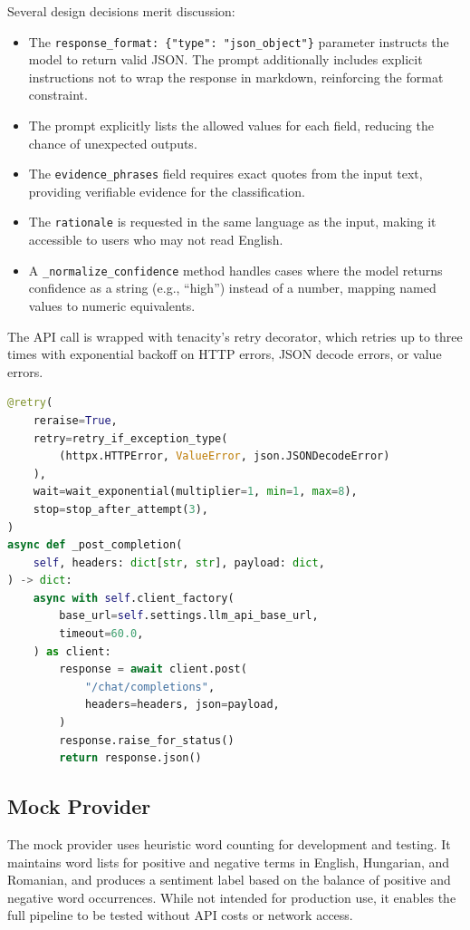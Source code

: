 Several design decisions merit discussion:

\begin{itemize}
    \item The \texttt{response\_format: \{"type": "json\_object"\}} parameter instructs the model to return valid JSON. The prompt additionally includes explicit instructions not to wrap the response in markdown, reinforcing the format constraint.
    \item The prompt explicitly lists the allowed values for each field, reducing the chance of unexpected outputs.
    \item The \texttt{evidence\_phrases} field requires exact quotes from the input text, providing verifiable evidence for the classification.
    \item The \texttt{rationale} is requested in the same language as the input, making it accessible to users who may not read English.
    \item A \texttt{\_normalize\_confidence} method handles cases where the model returns confidence as a string (e.g., ``high'') instead of a number, mapping named values to numeric equivalents.
\end{itemize}

The API call is wrapped with tenacity's retry decorator, which retries up to three times with exponential backoff on HTTP errors, JSON decode errors, or value errors.

\begin{lstlisting}[language=Python, caption={Retry-decorated API call}]
@retry(
    reraise=True,
    retry=retry_if_exception_type(
        (httpx.HTTPError, ValueError, json.JSONDecodeError)
    ),
    wait=wait_exponential(multiplier=1, min=1, max=8),
    stop=stop_after_attempt(3),
)
async def _post_completion(
    self, headers: dict[str, str], payload: dict,
) -> dict:
    async with self.client_factory(
        base_url=self.settings.llm_api_base_url,
        timeout=60.0,
    ) as client:
        response = await client.post(
            "/chat/completions",
            headers=headers, json=payload,
        )
        response.raise_for_status()
        return response.json()
\end{lstlisting}

\subsection{Mock Provider}

The mock provider uses heuristic word counting for development and testing. It maintains word lists for positive and negative terms in English, Hungarian, and Romanian, and produces a sentiment label based on the balance of positive and negative word occurrences. While not intended for production use, it enables the full pipeline to be tested without API costs or network access.

